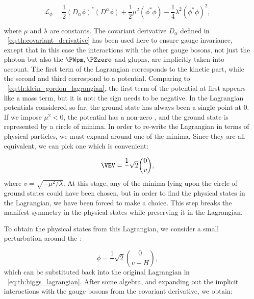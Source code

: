 \begin{equation}
\label{eq:th:higgs_lagrangian}
\mathcal{L}_{\phi} = \frac{1}{2}(D_{\alpha} \phi)^{*} (D^{\alpha} \phi) + \frac{1}{2} \mu^{2} (\phi^{*} \phi) - \frac{1}{4} \lambda^{2} (\phi^{*} \phi) ^{2} ,
\end{equation}

where $\mu$ and $\lambda$ are constants. The covariant derivative $D_{\alpha}$ defined in \Eq~\ref{eq:th:covariant_derivative} has been used here to ensure gauge invariance, except that in this case the interactions with the other gauge bosons, not just the photon but also the $\PWpm, \PZzero$ and glupns, are implicitly taken into account.
The first term of the Lagrangian corresponds to the kinetic part, while the second and third correspond to a potential. Comparing to \Eq~\ref{eq:th:klein_gordon_lagrangian}, the first term of the potential at first appears like a mass term, but it is not: the sign needs to be negative. In the Lagrangian potentials considered so far, the ground state has always been a single point at 0. If we impose $\mu^{2}<0$, the potential has a non-zero \VEV, and the ground state is represented by a circle of minima. In order to re-write the Lagrangian in terms of physical particles, we must expand around one of the minima. Since they are all equivalent, we can pick one which is convenient:

\begin{equation}
\label{eq:th:higgs_vev}
\VEV = \frac{1}{}\sqrt{2} \binom{0}{v} ,
\end{equation}
where $v=\sqrt{- \mu^{2} / \lambda}$. At this stage, any of the minima lying upon the circle of ground states could have been chosen, but in order to find the physical states in the Lagrangian, we have been forced to make a choice. This step breaks the manifest symmetry in the physical states while preserving it in the Lagrangian. 

To obtain the physical states from this Lagrangian, we consider a small perturbation around the \VEV: 

\begin{equation}
\label{eq:th:higgs_vev_perturbation}
\phi = \frac{1}{}\sqrt{2} \binom{0}{v+H} ,
\end{equation}
which can be substituted back into the original Lagrangian in \Eq~\ref{eq:th:higgs_lagrangian}. After some algebra, and expanding out the implicit interactions with the gauge bosons from the covariant derivative, we obtain:

